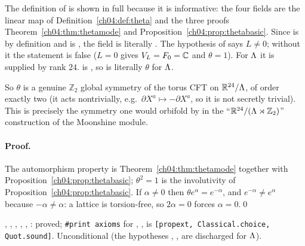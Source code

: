 \begin{dictionary}
The definition of  is shown in full because it is informative: the four fields are
the linear map of Definition~\ref{ch04:def:theta} and the three proofs
Theorem~\ref{ch04:thm:thetamode} and Proposition~\ref{ch04:prop:thetabasic}. Since
 is by definition  and  is
, the field  is literally . The hypothesis
 of  says $L\neq0$; without it the statement is false ($L=0$ gives
$V_L=F_0={\mathbb{C}}$ and $\theta=1$). For ${\Lambda}$ it is supplied by rank $24$.  is
, so  is literally $\theta$ for
${\Lambda}$.
\end{dictionary}

\begin{physics}
So $\theta$ is a genuine $\mathbb Z_2$ global symmetry of the torus CFT on $\mathbb R^{24}/{\Lambda}$, of order exactly two (it acts nontrivially, e.g.\ $\partial X^a\mapsto-\partial X^a$, so it is not secretly trivial). This is precisely the symmetry one would orbifold by in the ``$\mathbb R^{24}/({\Lambda}\rtimes\mathbb Z_2)$'' construction of the Moonshine module.
\end{physics}

\paragraph{Proof.} The automorphism property is Theorem~\ref{ch04:thm:thetamode} together with
Proposition~\ref{ch04:prop:thetabasic}; $\theta^2=1$ is the involutivity of
Proposition~\ref{ch04:prop:thetabasic}. If $\alpha\neq0$ then $\theta e^\alpha=e^{-\alpha}$, and
$e^{-\alpha}\neq e^{\alpha}$ because $-\alpha\neq\alpha$: a lattice is torsion-free, so $2\alpha=0$
forces $\alpha=0$.\qed

\begin{status}
, , , ,
, : proved; \texttt{\#print axioms} for
, ,  is
\texttt{[propext, Classical.choice, Quot.sound]}. Unconditional (the hypotheses ,
,  are discharged for ${\Lambda}$).
\end{status}

